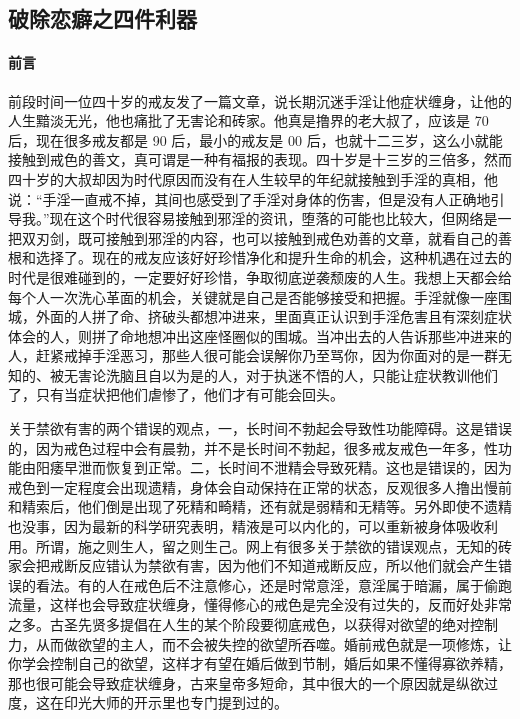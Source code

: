 \subsection{破除恋癖之四件利器}

\paragraph*{前言}

前段时间一位四十岁的戒友发了一篇文章，说长期沉迷手淫让他症状缠身，让他的人生黯淡无光，他也痛批了无害论和砖家。他真是撸界的老大叔了，应该是 70 后，现在很多戒友都是 90 后，最小的戒友是 00 后，也就十二三岁，这么小就能接触到戒色的善文，真可谓是一种有福报的表现。四十岁是十三岁的三倍多，然而四十岁的大叔却因为时代原因而没有在人生较早的年纪就接触到手淫的真相，他说：“手淫一直戒不掉，其间也感受到了手淫对身体的伤害，但是没有人正确地引导我。”现在这个时代很容易接触到邪淫的资讯，堕落的可能也比较大，但网络是一把双刃剑，既可接触到邪淫的内容，也可以接触到戒色劝善的文章，就看自己的善根和选择了。现在的戒友应该好好珍惜净化和提升生命的机会，这种机遇在过去的时代是很难碰到的，一定要好好珍惜，争取彻底逆袭颓废的人生。我想上天都会给每个人一次洗心革面的机会，关键就是自己是否能够接受和把握。手淫就像一座围城，外面的人拼了命、挤破头都想冲进来，里面真正认识到手淫危害且有深刻症状体会的人，则拼了命地想冲出这座怪圈似的围城。当冲出去的人告诉那些冲进来的人，赶紧戒掉手淫恶习，那些人很可能会误解你乃至骂你，因为你面对的是一群无知的、被无害论洗脑且自以为是的人，对于执迷不悟的人，只能让症状教训他们了，只有当症状把他们虐惨了，他们才有可能会回头。

关于禁欲有害的两个错误的观点，一，长时间不勃起会导致性功能障碍。这是错误的，因为戒色过程中会有晨勃，并不是长时间不勃起，很多戒友戒色一年多，性功能由阳痿早泄而恢复到正常。二，长时间不泄精会导致死精。这也是错误的，因为戒色到一定程度会出现遗精，身体会自动保持在正常的状态，反观很多人撸出慢前和精索后，他们倒是出现了死精和畸精，还有就是弱精和无精等。另外即使不遗精也没事，因为最新的科学研究表明，精液是可以内化的，可以重新被身体吸收利用。所谓，施之则生人，留之则生己。网上有很多关于禁欲的错误观点，无知的砖家会把戒断反应错认为禁欲有害，因为他们不知道戒断反应，所以他们就会产生错误的看法。有的人在戒色后不注意修心，还是时常意淫，意淫属于暗漏，属于偷跑流量，这样也会导致症状缠身，懂得修心的戒色是完全没有过失的，反而好处非常之多。古圣先贤多提倡在人生的某个阶段要彻底戒色，以获得对欲望的绝对控制力，从而做欲望的主人，而不会被失控的欲望所吞噬。婚前戒色就是一项修炼，让你学会控制自己的欲望，这样才有望在婚后做到节制，婚后如果不懂得寡欲养精，那也很可能会导致症状缠身，古来皇帝多短命，其中很大的一个原因就是纵欲过度，这在印光大师的开示里也专门提到过的。

